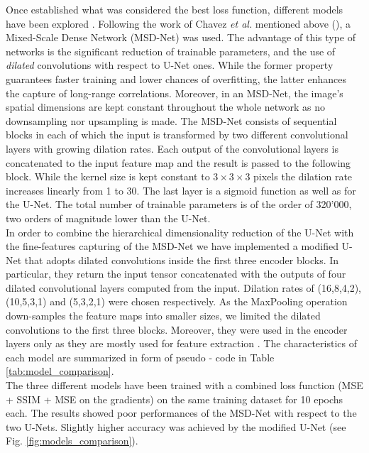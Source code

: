 Once established what was considered the best loss function, different models have been explored . 
Following the work of Chavez \textit{et al.} mentioned above (\cite{chavez_comparison_2022}), a 
Mixed-Scale Dense Network (MSD-Net) was used. The advantage of this type of networks is the significant reduction of trainable
parameters, and the use of \textit{dilated} convolutions with respect to U-Net ones. While the former property guarantees
faster training and lower chances of overfitting, the latter enhances the capture of long-range correlations. Moreover, 
in an MSD-Net, the image's spatial dimensions are kept constant throughout the whole network as no downsampling nor upsampling is made.
The MSD-Net consists of sequential blocks in each of which the input is transformed by two different 
convolutional layers with growing dilation rates. Each output of the convolutional layers is concatenated to the input 
feature map and the result is passed to the following block. While the kernel size is kept constant to $3\times3\times3$ pixels
the dilation rate increases linearly from 1 to 30. The last layer is a sigmoid function as well as for the U-Net. 
The total number of trainable parameters is of the order of 320'000, two orders of magnitude lower than the U-Net.
\\
In order to combine the hierarchical dimensionality reduction of the U-Net with the fine-features capturing of the MSD-Net 
we have implemented a modified U-Net that adopts dilated convolutions inside the first three encoder blocks. In particular, 
they return the input tensor concatenated with the outputs of four dilated convolutional layers computed
from the input. Dilation rates of (16,8,4,2), (10,5,3,1) and (5,3,2,1) were chosen respectively. As the MaxPooling 
operation down-samples the feature maps into smaller sizes, we limited the dilated convolutions to the first three 
blocks. Moreover, they were used in the encoder layers only as they are mostly used for feature extraction \cite{dilated_conv}.
The characteristics of each model are summarized in form of pseudo - code in Table \ref{tab:model_comparison}.
\\

The three different models have been trained with a combined loss function (MSE + SSIM + MSE on the gradients) on the 
same training dataset for 10 epochs each.  The results showed poor performances of the MSD-Net with respect to the two 
U-Nets. Slightly higher accuracy was achieved by the modified U-Net (see Fig. \ref{fig:models_comparison}). 

